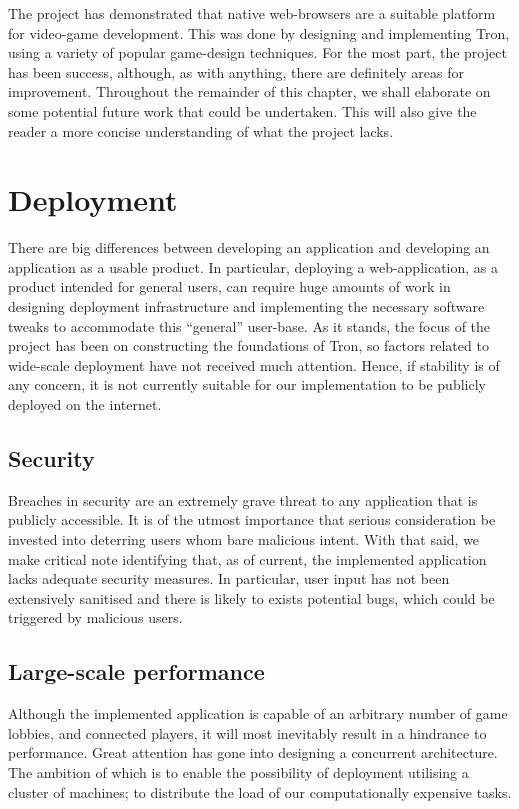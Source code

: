 \documentclass{standalone}
\begin{document}
	The project has demonstrated that native web-browsers are a suitable platform for video-game development. This was done by designing and implementing Tron, using a variety of popular game-design techniques. For the most part, the project has been success, although, as with anything, there are definitely areas for improvement. Throughout the remainder of this chapter, we shall elaborate on some potential future work that could be undertaken. This will also give the reader a more concise understanding of what the project lacks.

	\section{Deployment}
		There are big differences between developing an application and developing an application as a usable product. In particular, deploying a web-application, as a product intended for general users, can require huge amounts of work in designing deployment infrastructure and implementing the necessary software tweaks to accommodate this \enquote{general} user-base. As it stands, the focus of the project has been on constructing the foundations of Tron, so factors related to wide-scale deployment have not received much attention. Hence, if stability is of any concern, it is not currently suitable for our implementation to be publicly deployed on the internet.

		\subsection{Security}
			Breaches in security are an extremely grave threat to any application that is publicly accessible. It is of the utmost importance that serious consideration be invested into deterring users whom bare malicious intent. With that said, we make critical note identifying that, as of current, the implemented application lacks adequate security measures. In particular, user input has not been extensively sanitised and there is likely to exists potential bugs, which could be triggered by malicious users.

		\subsection{Large-scale performance}
			Although the implemented application is capable of an arbitrary number of game lobbies, and connected players, it will most inevitably result in a hindrance to performance. Great attention has gone into designing a concurrent architecture. The ambition of which is to enable the possibility of deployment utilising a cluster of machines; to distribute the load of our computationally expensive tasks.
\end{document}
